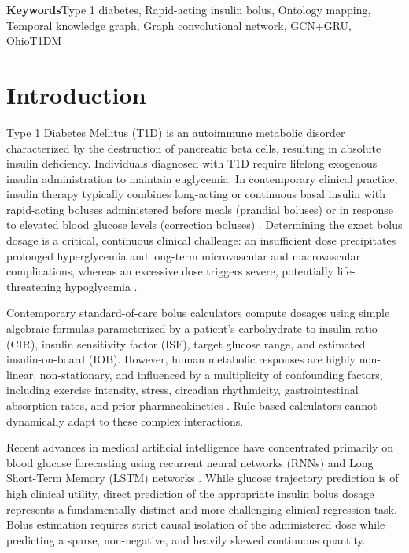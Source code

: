 \documentclass[10pt,a4paper]{article}
\begin{document}
\medskip
\noindent\textbf{Keywords}\enspace Type 1 diabetes, Rapid-acting insulin bolus, Ontology mapping, Temporal knowledge graph, Graph convolutional network, GCN+GRU, OhioT1DM
\endgroup

\section{Introduction}
Type 1 Diabetes Mellitus (T1D) is an autoimmune metabolic disorder characterized by the destruction of pancreatic beta cells, resulting in absolute insulin deficiency. Individuals diagnosed with T1D require lifelong exogenous insulin administration to maintain euglycemia. In contemporary clinical practice, insulin therapy typically combines long-acting or continuous basal insulin with rapid-acting boluses administered before meals (prandial boluses) or in response to elevated blood glucose levels (correction boluses) \cite{contreras2018}. Determining the exact bolus dosage is a critical, continuous clinical challenge: an insufficient dose precipitates prolonged hyperglycemia and long-term microvascular and macrovascular complications, whereas an excessive dose triggers severe, potentially life-threatening hypoglycemia \cite{nemat2024}.

Contemporary standard-of-care bolus calculators compute dosages using simple algebraic formulas parameterized by a patient's carbohydrate-to-insulin ratio (CIR), insulin sensitivity factor (ISF), target glucose range, and estimated insulin-on-board (IOB). However, human metabolic responses are highly non-linear, non-stationary, and influenced by a multiplicity of confounding factors, including exercise intensity, stress, circadian rhythmicity, gastrointestinal absorption rates, and prior pharmacokinetics \cite{li2020}. Rule-based calculators cannot dynamically adapt to these complex interactions.

Recent advances in medical artificial intelligence have concentrated primarily on blood glucose forecasting using recurrent neural networks (RNNs) and Long Short-Term Memory (LSTM) networks \cite{hochreiter1997, mirshekarian2019}. While glucose trajectory prediction is of high clinical utility, direct prediction of the appropriate insulin bolus dosage represents a fundamentally distinct and more challenging clinical regression task. Bolus estimation requires strict causal isolation of the administered dose while predicting a sparse, non-negative, and heavily skewed continuous quantity.
\end{document}
